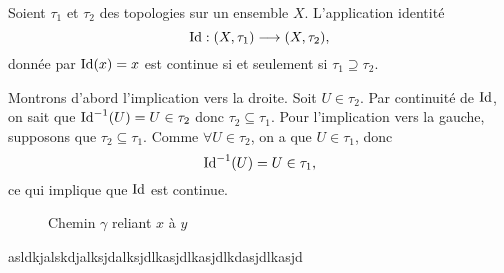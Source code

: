 \documentclass[french]{article}
\begin{document}
\begin{lemme}
  Soient $\tau_1$ et $\tau_2$ des topologies sur un ensemble $X$. L'application identité
  $$\operatorname{Id}: (X, \tau_1) \longrightarrow (X, \tau_2),$$
  donnée par $\operatorname{Id}(x) = x$ est continue si et seulement si $\tau_1 \supseteq \tau_2$.

  \tcblower
  \begin{preuve}
    Montrons d'abord l'implication vers la droite. Soit $U \in \tau_2$. Par continuité de $\operatorname{Id}$, on sait que $\operatorname{Id}^{-1}(U) = U \in \tau_2$ donc $\tau_2 \subseteq \tau_1$.
    Pour l'implication vers la gauche, supposons que $\tau_2 \subseteq \tau_1$. Comme $\forall U \in \tau_2$, on a que $U \in \tau_1$, donc
    $$\operatorname{Id}^{-1}(U) = U \in \tau_1,$$
    ce qui implique que $\operatorname{Id}$ est continue.
  \end{preuve}
\end{lemme}


\newpage

\begin{figure}[ht]
  \centering
  \caption{Chemin $\gamma$ reliant $x$ à $y$}
\end{figure}

asldkjalskdjalksjdalksjdlkasjdlkasjdlkdasjdlkasjd
\end{document}
